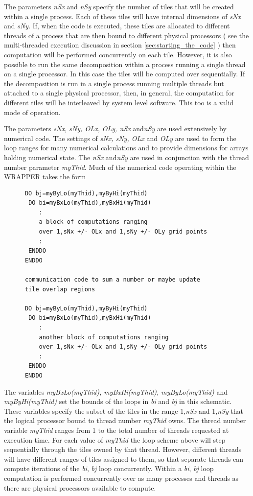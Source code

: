  The parameters {\em nSx} and {\em nSy} specify the number of tiles that will
be created within a single process. Each of these tiles will have internal
dimensions of {\em sNx} and {\em sNy}. If, when the code is executed, these tiles are 
allocated to different threads of a process that are then bound to
different physical processors ( see the multi-threaded
execution discussion in section \ref{sec:starting_the_code} ) then
computation will be performed concurrently on each tile. However, it is also
possible to run the same decomposition within a process running a single thread on
a single processor. In this case the tiles will be computed over sequentially.
If the decomposition is run in a single process running multiple threads
but attached to a single physical processor, then, in general, the computation
for different tiles will be interleaved by system level software.
This too is a valid mode of operation.

 The parameters {\em sNx, sNy, OLx, OLy, nSx} and{\em nSy} are used extensively by
numerical code. The settings of {\em sNx, sNy, OLx} and {\em OLy}
are used to form the loop ranges for many numerical calculations and
to provide dimensions for arrays holding numerical state.
The {\em nSx} and{\em nSy} are used in conjunction with the thread number
parameter {\em myThid}. Much of the numerical code operating within the
WRAPPER takes the form 
\begin{verbatim}
      DO bj=myByLo(myThid),myByHi(myThid)
       DO bi=myBxLo(myThid),myBxHi(myThid)
          :
          a block of computations ranging 
          over 1,sNx +/- OLx and 1,sNy +/- OLy grid points
          :
       ENDDO
      ENDDO

      communication code to sum a number or maybe update
      tile overlap regions

      DO bj=myByLo(myThid),myByHi(myThid)
       DO bi=myBxLo(myThid),myBxHi(myThid)
          :
          another block of computations ranging 
          over 1,sNx +/- OLx and 1,sNy +/- OLy grid points
          :
       ENDDO
      ENDDO
\end{verbatim}
The variables {\em myBxLo(myThid), myBxHi(myThid), myByLo(myThid)} and {\em
myByHi(myThid)} set the bounds of the loops in {\em bi} and {\em bj} in this 
schematic. These variables specify the subset of the tiles in
the range 1,{\em nSx} and 1,{\em nSy} that the logical processor bound to
thread number {\em myThid} owns. The thread number variable {\em myThid} 
ranges from 1 to the total number of threads requested at execution time.
For each value of {\em myThid} the loop scheme above will step sequentially
through the tiles owned by that thread. However, different threads will
have different ranges of tiles assigned to them, so that separate threads can
compute iterations of the {\em bi}, {\em bj} loop concurrently.
Within a {\em bi}, {\em bj} loop
computation is performed concurrently over as many processes and threads
as there are physical processors available to compute.

